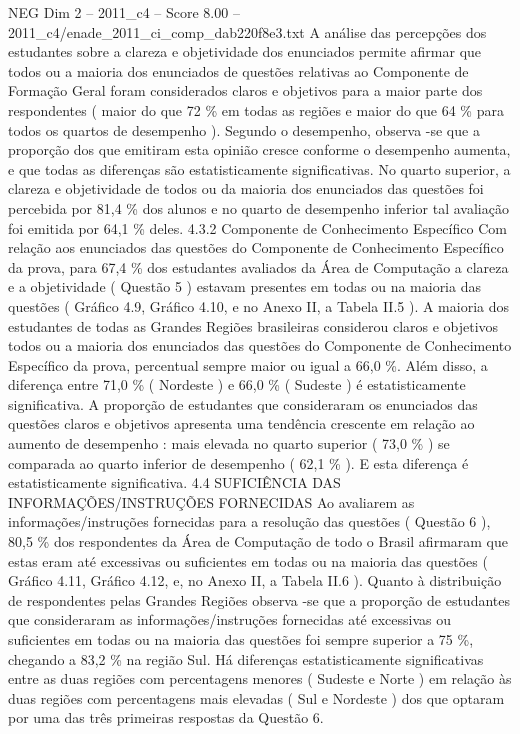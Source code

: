 \begin{textsample}{NEG Dim 2 – 2011\_c4 – Score 8.00 – 2011\_c4/enade\_2011\_ci\_comp\_dab220f8e3.txt}
A análise das percepções dos estudantes sobre a clareza e objetividade dos enunciados permite afirmar que todos ou a maioria dos enunciados de questões relativas ao Componente de Formação Geral foram considerados claros e objetivos para a maior parte dos respondentes ( maior do que 72 \% em todas as regiões e maior do que 64 \% para todos os quartos de desempenho ).
Segundo o desempenho, observa -se que a proporção dos que emitiram esta opinião cresce conforme o desempenho aumenta, e que todas as diferenças são estatisticamente significativas.
No quarto superior, a clareza e objetividade de todos ou da maioria dos enunciados das questões foi percebida por 81,4 \% dos alunos e no quarto de desempenho inferior tal avaliação foi emitida por 64,1 \% deles. 4.3.2 Componente de Conhecimento Específico Com relação aos enunciados das questões do Componente de Conhecimento Específico da prova, para 67,4 \% dos estudantes avaliados da Área de Computação a clareza e a objetividade ( Questão 5 ) estavam presentes em todas ou na maioria das questões ( Gráfico 4.9, Gráfico 4.10, e no Anexo II, a Tabela II.5 ).
A maioria dos estudantes de todas as Grandes Regiões brasileiras considerou claros e objetivos todos ou a maioria dos enunciados das questões do Componente de Conhecimento Específico da prova, percentual sempre maior ou igual a 66,0 \%.
Além disso, a diferença entre 71,0 \% ( Nordeste ) e 66,0 \% ( Sudeste ) é estatisticamente significativa.
A proporção de estudantes que consideraram os enunciados das questões claros e objetivos apresenta uma tendência crescente em relação ao aumento de desempenho : mais elevada no quarto superior ( 73,0 \% ) se comparada ao quarto inferior de desempenho ( 62,1 \% ).
E esta diferença é estatisticamente significativa. 4.4 SUFICIÊNCIA DAS INFORMAÇÕES/INSTRUÇÕES FORNECIDAS Ao avaliarem as informações/instruções fornecidas para a resolução das questões ( Questão 6 ), 80,5 \% dos respondentes da Área de Computação de todo o Brasil afirmaram que estas eram até excessivas ou suficientes em todas ou na maioria das questões ( Gráfico 4.11, Gráfico 4.12, e, no Anexo II, a Tabela II.6 ).
Quanto à distribuição de respondentes pelas Grandes Regiões observa -se que a proporção de estudantes que consideraram as informações/instruções fornecidas até excessivas ou suficientes em todas ou na maioria das questões foi sempre superior a 75 \%, chegando a 83,2 \% na região Sul.
Há diferenças estatisticamente significativas entre as duas regiões com percentagens menores ( Sudeste e Norte ) em relação às duas regiões com percentagens mais elevadas ( Sul e Nordeste ) dos que optaram por uma das três primeiras respostas da Questão 6.

\end{textsample}
